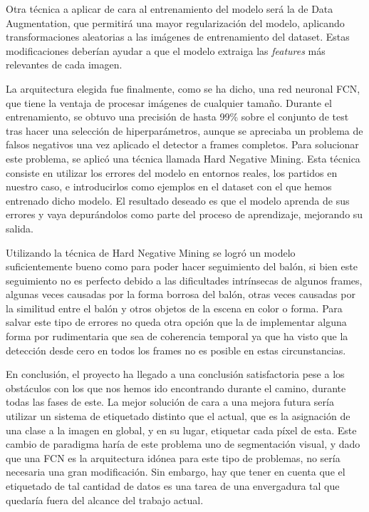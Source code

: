 Otra técnica a aplicar de cara al entrenamiento del modelo será la de Data Augmentation, que permitirá una mayor regularización del modelo, aplicando transformaciones aleatorias a las imágenes de entrenamiento del dataset. Estas modificaciones deberían ayudar a que el modelo extraiga las \textit{features} más relevantes de cada imagen.

La arquitectura elegida fue finalmente, como se ha dicho, una red neuronal FCN, que tiene la ventaja de procesar imágenes de cualquier tamaño. Durante el entrenamiento, se obtuvo una precisión de hasta 99\% sobre el conjunto de test tras hacer una selección de hiperparámetros, aunque se apreciaba un problema de falsos negativos una vez aplicado el detector a frames completos. Para solucionar este problema, se aplicó una técnica llamada Hard Negative Mining. Esta técnica consiste en utilizar los errores del modelo en entornos reales, los partidos en nuestro caso, e introducirlos como ejemplos en el dataset con el que hemos entrenado dicho modelo. El resultado deseado es que el modelo aprenda de sus errores y vaya depurándolos como parte del proceso de aprendizaje, mejorando su salida.

Utilizando la técnica de Hard Negative Mining se logró un modelo suficientemente bueno como para poder hacer seguimiento del balón, si bien este seguimiento no es perfecto debido a las dificultades intrínsecas de algunos frames, algunas veces causadas por la forma borrosa del balón, otras veces causadas por la similitud entre el balón y otros objetos de la escena en color o forma. Para salvar este tipo de errores no queda otra opción que la de implementar alguna forma por rudimentaria que sea de coherencia temporal ya que ha visto que la detección desde cero en todos los frames no es posible en estas circunstancias.

En conclusión, el proyecto ha llegado a una conclusión satisfactoria pese a los obstáculos con los que nos hemos ido encontrando durante el camino, durante todas las fases de este. La mejor solución de cara a una mejora futura sería utilizar un sistema de etiquetado distinto que el actual, que es la asignación de una clase a la imagen en global, y en su lugar, etiquetar cada píxel de esta. Este cambio de paradigma haría de este problema uno de segmentación visual, y dado que una FCN es la arquitectura idónea para este tipo de problemas, no sería necesaria una gran modificación. Sin embargo, hay que tener en cuenta que el etiquetado de tal cantidad de datos es una tarea de una envergadura tal que quedaría fuera del alcance del trabajo actual.


